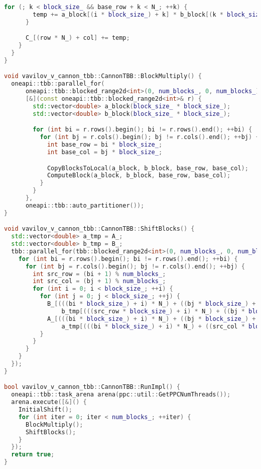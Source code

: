 \documentclass[a4paper,12pt]{article}
\begin{document}
\begin{lstlisting}[language=C++]
      for (; k < block_size_ && base_row + k < N_; ++k) {
        temp += a_block[(i * block_size_) + k] * b_block[(k * block_size_) + j];
      }

      C_[(row * N_) + col] += temp;
    }
  }
}

void vavilov_v_cannon_tbb::CannonTBB::BlockMultiply() {
  oneapi::tbb::parallel_for(
      oneapi::tbb::blocked_range2d<int>(0, num_blocks_, 0, num_blocks_),
      [&](const oneapi::tbb::blocked_range2d<int>& r) {
        std::vector<double> a_block(block_size_ * block_size_);
        std::vector<double> b_block(block_size_ * block_size_);

        for (int bi = r.rows().begin(); bi != r.rows().end(); ++bi) {
          for (int bj = r.cols().begin(); bj != r.cols().end(); ++bj) {
            int base_row = bi * block_size_;
            int base_col = bj * block_size_;

            CopyBlocksToLocal(a_block, b_block, base_row, base_col);
            ComputeBlock(a_block, b_block, base_row, base_col);
          }
        }
      },
      oneapi::tbb::auto_partitioner());
}

void vavilov_v_cannon_tbb::CannonTBB::ShiftBlocks() {
  std::vector<double> a_tmp = A_;
  std::vector<double> b_tmp = B_;
  tbb::parallel_for(tbb::blocked_range2d<int>(0, num_blocks_, 0, num_blocks_), [&](const tbb::blocked_range2d<int>& r) {
    for (int bi = r.rows().begin(); bi != r.rows().end(); ++bi) {
      for (int bj = r.cols().begin(); bj != r.cols().end(); ++bj) {
        int src_row = (bi + 1) % num_blocks_;
        int src_col = (bj + 1) % num_blocks_;
        for (int i = 0; i < block_size_; ++i) {
          for (int j = 0; j < block_size_; ++j) {
            B_[(((bi * block_size_) + i) * N_) + ((bj * block_size_) + j)] =
                b_tmp[(((src_row * block_size_) + i) * N_) + ((bj * block_size_) + j)];
            A_[(((bi * block_size_) + i) * N_) + ((bj * block_size_) + j)] =
                a_tmp[(((bi * block_size_) + i) * N_) + ((src_col * block_size_) + j)];
          }
        }
      }
    }
  });
}

bool vavilov_v_cannon_tbb::CannonTBB::RunImpl() {
  oneapi::tbb::task_arena arena(ppc::util::GetPPCNumThreads());
  arena.execute([&]() {
    InitialShift();
    for (int iter = 0; iter < num_blocks_; ++iter) {
      BlockMultiply();
      ShiftBlocks();
    }
  });
  return true;
}

\end{lstlisting}
\end{document}
